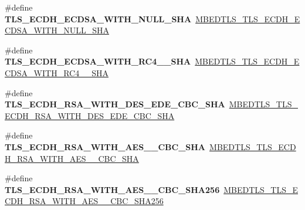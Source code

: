 \begin{DoxyCompactItemize}
\item 
\mbox{\label{compat-1_83_8h_a9b63e2ae0fc7c63de22c47d1a48c1d4a}} 
\#define {\bfseries T\+L\+S\+\_\+\+E\+C\+D\+H\+\_\+\+E\+C\+D\+S\+A\+\_\+\+W\+I\+T\+H\+\_\+\+N\+U\+L\+L\+\_\+\+S\+HA}~\mbox{\hyperlink{ssl__ciphersuites_8h_a8a4c3646207f54191ad34ae9d02606b6}{M\+B\+E\+D\+T\+L\+S\+\_\+\+T\+L\+S\+\_\+\+E\+C\+D\+H\+\_\+\+E\+C\+D\+S\+A\+\_\+\+W\+I\+T\+H\+\_\+\+N\+U\+L\+L\+\_\+\+S\+HA}}
\item 
\mbox{\label{compat-1_83_8h_a9eee29157ffc25d3935887f5b35b88f7}} 
\#define {\bfseries T\+L\+S\+\_\+\+E\+C\+D\+H\+\_\+\+E\+C\+D\+S\+A\+\_\+\+W\+I\+T\+H\+\_\+\+R\+C4\+\_\+\_\+\+S\+HA}~\mbox{\hyperlink{ssl__ciphersuites_8h_aa46f4ef6ad2c9d60de5900f6b8c13129}{M\+B\+E\+D\+T\+L\+S\+\_\+\+T\+L\+S\+\_\+\+E\+C\+D\+H\+\_\+\+E\+C\+D\+S\+A\+\_\+\+W\+I\+T\+H\+\_\+\+R\+C4\+\_\+\_\+\+S\+HA}}
\item 
\mbox{\label{compat-1_83_8h_a89d57fa35a820dd9dec0e39ad8b3144a}} 
\#define {\bfseries T\+L\+S\+\_\+\+E\+C\+D\+H\+\_\+\+R\+S\+A\+\_\+\+W\+I\+T\+H\+\_\+D\+E\+S\+\_\+\+E\+D\+E\+\_\+\+C\+B\+C\+\_\+\+S\+HA}~\mbox{\hyperlink{ssl__ciphersuites_8h_a8ec3be9c63eff67d2c72d036ab727c6b}{M\+B\+E\+D\+T\+L\+S\+\_\+\+T\+L\+S\+\_\+\+E\+C\+D\+H\+\_\+\+R\+S\+A\+\_\+\+W\+I\+T\+H\+\_\+D\+E\+S\+\_\+\+E\+D\+E\+\_\+\+C\+B\+C\+\_\+\+S\+HA}}
\item 
\mbox{\label{compat-1_83_8h_aa91806e0632eb2034cade163f96e08b2}} 
\#define {\bfseries T\+L\+S\+\_\+\+E\+C\+D\+H\+\_\+\+R\+S\+A\+\_\+\+W\+I\+T\+H\+\_\+\+A\+E\+S\+\_\+\_\+\+C\+B\+C\+\_\+\+S\+HA}~\mbox{\hyperlink{ssl__ciphersuites_8h_a843c783ca0e8255e290afbd35e83ba92}{M\+B\+E\+D\+T\+L\+S\+\_\+\+T\+L\+S\+\_\+\+E\+C\+D\+H\+\_\+\+R\+S\+A\+\_\+\+W\+I\+T\+H\+\_\+\+A\+E\+S\+\_\+\_\+\+C\+B\+C\+\_\+\+S\+HA}}
\item 
\mbox{\label{compat-1_83_8h_a5f88bf757bb85ecfe28fd5264e2721a8}} 
\#define {\bfseries T\+L\+S\+\_\+\+E\+C\+D\+H\+\_\+\+R\+S\+A\+\_\+\+W\+I\+T\+H\+\_\+\+A\+E\+S\+\_\+\_\+\+C\+B\+C\+\_\+\+S\+H\+A256}~\mbox{\hyperlink{ssl__ciphersuites_8h_a01aeb5655adae861d06739d10fe141b3}{M\+B\+E\+D\+T\+L\+S\+\_\+\+T\+L\+S\+\_\+\+E\+C\+D\+H\+\_\+\+R\+S\+A\+\_\+\+W\+I\+T\+H\+\_\+\+A\+E\+S\+\_\+\_\+\+C\+B\+C\+\_\+\+S\+H\+A256}}
\item 

\end{DoxyCompactItemize}
